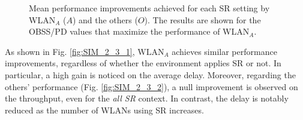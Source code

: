 \documentclass[comsoc]{IEEEtran}
\begin{document}
	\begin{figure}[ht!]
		\centering		
		\caption{Mean performance improvements achieved for each SR setting by WLAN$_A$ ($A$) and the others ($O$). The results are shown for the OBSS/PD values that maximize the performance of WLAN$_A$.}\label{fig:SIM_2_3}
	\end{figure}
	
	As shown in Fig. \ref{fig:SIM_2_3_1}, $\text{WLAN}_A$ achieves similar performance improvements, regardless of whether the environment applies SR or not. In particular, a high gain is noticed on the average delay. Moreover, regarding the others' performance (Fig. \ref{fig:SIM_2_3_2}), a null improvement is observed on the throughput, even for the \emph{all SR} context. In contrast, the delay is notably reduced as the number of WLANs using SR increases.
	
\end{document}
